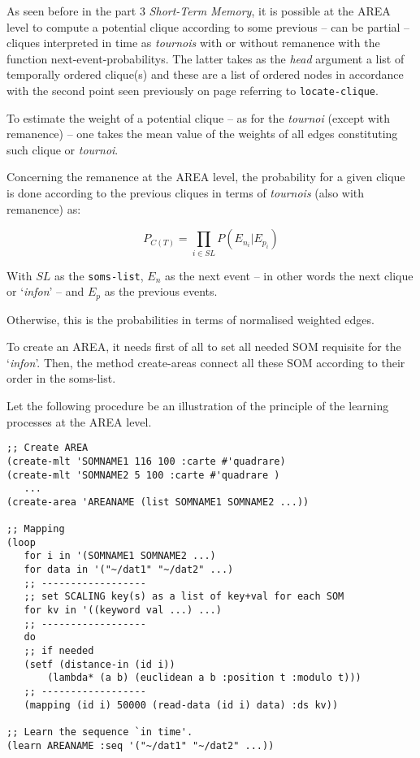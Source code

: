 \bigskip

As seen before in the part 3 \textsl{Short-Term Memory}, it is possible at the AREA level to compute a potential clique according to some previous -- can be partial -- cliques interpreted in time as \textit{tournois} with or without remanence with the function \glspl{next-event-probability}. The latter takes as the \textit{head} argument a list of temporally ordered clique(s) and these are a list of ordered nodes in accordance with the second point seen previously on page \pageref{txt:on} referring to \texttt{locate-clique}.

\smallskip

To estimate the weight of a potential clique -- as for the \textit{tournoi} (except with remanence) -- one takes the mean value of the weights of all edges constituting such clique or \textit{tournoi}. 

\smallskip
Concerning the remanence at the AREA level, the probability for a given clique is done according to the previous cliques in terms of \textit{tournois} (also with remanence) as:

$$P_{C(T)} = \displaystyle \prod_{i \in SL} P(E_{n_i}|E_{p_i})$$

With $SL$ as the \texttt{soms-list}, $E_{n}$ as the next event -- in other words the next clique or `\textit{infon}' -- and  $E_{p}$ as the previous events.

\smallskip

Otherwise, this is the probabilities in terms of normalised weighted edges.

\bigskip
\bigskip


\bigskip

To create an AREA, it needs first of all to set all needed SOM requisite for the `\textit{infon}'. Then, the method \glspl{create-area} connect all these SOM according to their order in the soms-list.

\bigskip

Let the following procedure be an illustration of the principle of the learning processes at the AREA level.

\begin{lstlisting}[language=N3]
;; Create AREA
(create-mlt 'SOMNAME1 116 100 :carte #'quadrare)
(create-mlt 'SOMNAME2 5 100 :carte #'quadrare )
   ...
(create-area 'AREANAME (list SOMNAME1 SOMNAME2 ...))

;; Mapping 
(loop
   for i in '(SOMNAME1 SOMNAME2 ...)
   for data in '("~/dat1" "~/dat2" ...)
   ;; ------------------
   ;; set SCALING key(s) as a list of key+val for each SOM
   for kv in '((keyword val ...) ...) 
   ;; ------------------
   do
   ;; if needed
   (setf (distance-in (id i))
	   (lambda* (a b) (euclidean a b :position t :modulo t)))
   ;; ------------------
   (mapping (id i) 50000 (read-data (id i) data) :ds kv))
       
;; Learn the sequence `in time'.
(learn AREANAME :seq '("~/dat1" "~/dat2" ...))
\end{lstlisting}

